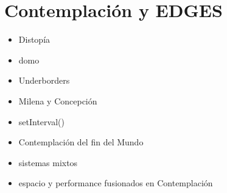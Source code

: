 
\section*{Contemplación y EDGES} %

\begin{itemize}
\item Distopía
\item domo 
\item Underborders
\item Milena y Concepción
\item setInterval()
\item Contemplación del fin del Mundo
\item sistemas mixtos
\item espacio y performance fusionados en Contemplación
\end{itemize}

